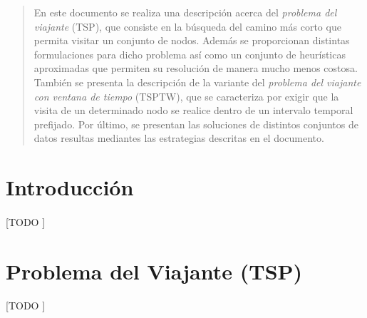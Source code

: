 \documentclass[spanish]{article}
\begin{document}
	\maketitle %

	\thispagestyle{fancy} %



	\begin{abstract}
		\noindent En este documento se realiza una descripción acerca del \emph{problema del viajante} (TSP), que consiste en la búsqueda del camino más corto que permita visitar un conjunto de nodos. Además se proporcionan distintas formulaciones para dicho problema así como un conjunto de heurísticas aproximadas que permiten su resolución de manera mucho menos costosa. También se presenta la descripción de la variante del \emph{problema del viajante con ventana de tiempo} (TSPTW), que se caracteriza por exigir que la visita de un determinado nodo se realice dentro de un intervalo temporal prefijado. Por último, se presentan las soluciones de distintos conjuntos de datos resultas mediantes las estrategias descritas en el documento.
	\end{abstract}


	\section{Introducción}
	\label{sec:intro}

		\paragraph{}
		[TODO ]

	\section{Problema del Viajante (TSP)}

		\paragraph{}
		[TODO ]
\end{document}
